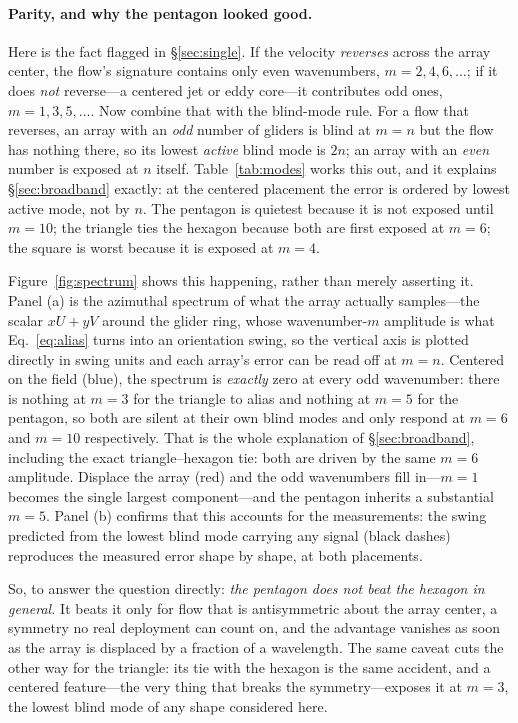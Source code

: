 \documentclass[11pt]{article}
\begin{document}
\paragraph{Parity, and why the pentagon looked good.} Here is the fact flagged in
\S\ref{sec:single}. If the velocity \emph{reverses} across the array center, the flow's
signature contains only even wavenumbers, $m=2,4,6,\dots$; if it does \emph{not} reverse---a
centered jet or eddy core---it contributes odd ones, $m=1,3,5,\dots$. Now combine that with the
blind-mode rule. For a flow that reverses, an array with an \emph{odd} number of gliders is
blind at $m=n$ but the flow has nothing there, so its lowest \emph{active} blind mode is $2n$;
an array with an \emph{even} number is exposed at $n$ itself. Table~\ref{tab:modes} works this
out, and it explains \S\ref{sec:broadband} exactly: at the centered placement the error is
ordered by lowest active mode, not by $n$. The pentagon is quietest because it is not exposed
until $m=10$; the triangle ties the hexagon because both are first exposed at $m=6$; the square
is worst because it is exposed at $m=4$.

Figure~\ref{fig:spectrum} shows this happening, rather than merely asserting it. Panel (a) is the
azimuthal spectrum of what the array actually samples---the scalar $xU+yV$ around the glider
ring, whose wavenumber-$m$ amplitude is what Eq.~\eqref{eq:alias} turns into an orientation
swing, so the vertical axis is plotted directly in swing units and each array's error can be
read off at $m=n$. Centered on the field (blue), the spectrum is \emph{exactly} zero at every odd
wavenumber: there is nothing at $m=3$ for the triangle to alias and nothing at $m=5$ for the
pentagon, so both are silent at their own blind modes and only respond at $m=6$ and $m=10$
respectively. That is the whole explanation of \S\ref{sec:broadband}, including the exact
triangle--hexagon tie: both are driven by the same $m=6$ amplitude. Displace the array (red) and
the odd wavenumbers fill in---$m=1$ becomes the single largest component---and the pentagon
inherits a substantial $m=5$. Panel (b) confirms that this accounts for the measurements: the
swing predicted from the lowest blind mode carrying any signal (black dashes) reproduces the
measured error shape by shape, at both placements.

So, to answer the question directly: \emph{the pentagon does not beat the hexagon in general.} It
beats it only for flow that is antisymmetric about the array center, a symmetry no real
deployment can count on, and the advantage vanishes as soon as the array is displaced by a
fraction of a wavelength. The same caveat cuts the other way for the triangle: its tie with the
hexagon is the same accident, and a centered feature---the very thing that breaks the
symmetry---exposes it at $m=3$, the lowest blind mode of any shape considered here.
\end{document}
